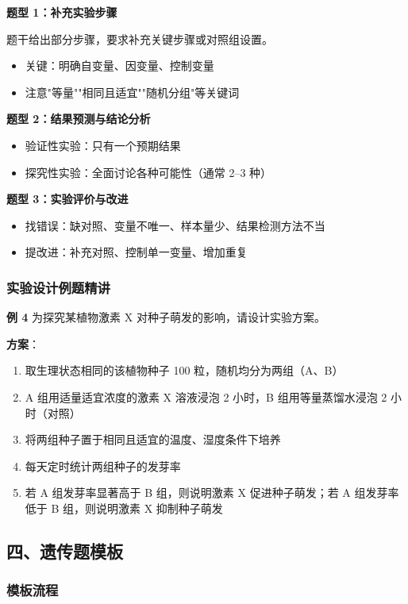 \textbf{题型 1：补充实验步骤}

题干给出部分步骤，要求补充关键步骤或对照组设置。
\begin{itemize}
  \item 关键：明确自变量、因变量、控制变量
  \item 注意"等量""相同且适宜""随机分组"等关键词
\end{itemize}

\textbf{题型 2：结果预测与结论分析}

\begin{itemize}
  \item 验证性实验：只有一个预期结果
  \item 探究性实验：全面讨论各种可能性（通常 2--3 种）
\end{itemize}

\textbf{题型 3：实验评价与改进}

\begin{itemize}
  \item 找错误：缺对照、变量不唯一、样本量少、结果检测方法不当
  \item 提改进：补充对照、控制单一变量、增加重复
\end{itemize}

\subsubsection{实验设计例题精讲}

\textbf{例 4} 为探究某植物激素 X 对种子萌发的影响，请设计实验方案。

\textbf{方案}：
\begin{enumerate}
  \item 取生理状态相同的该植物种子 100 粒，随机均分为两组（A、B）
  \item A 组用适量适宜浓度的激素 X 溶液浸泡 2 小时，B 组用等量蒸馏水浸泡 2 小时（对照）
  \item 将两组种子置于相同且适宜的温度、湿度条件下培养
  \item 每天定时统计两组种子的发芽率
  \item 若 A 组发芽率显著高于 B 组，则说明激素 X 促进种子萌发；若 A 组发芽率低于 B 组，则说明激素 X 抑制种子萌发
\end{enumerate}

\subsection{四、遗传题模板}

\subsubsection{模板流程}

